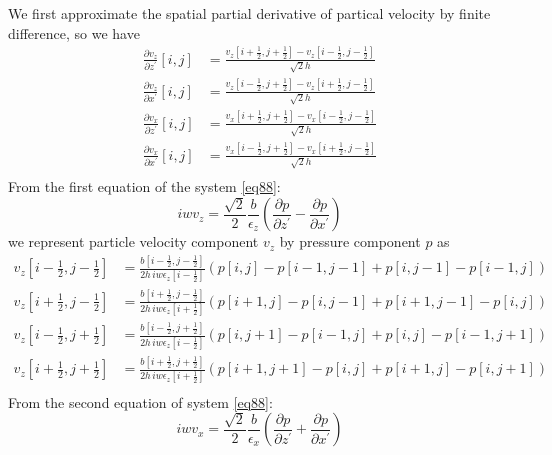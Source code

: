 \documentclass[revised,endfloat]{geophysics}
\begin{document}
We first approximate the spatial partial derivative of partical velocity by finite difference, so we have
\begin{equation}
\begin{split}
\frac{\partial v_z}{\partial z^{\prime}}[i,j] &= \frac{v_z[i+\frac{1}{2},j+\frac{1}{2}] - v_z[i-\frac{1}{2},j-\frac{1}{2}] }{\sqrt{2}h} \\
\frac{\partial v_z}{\partial x^{\prime}}[i,j] &= \frac{v_z[i-\frac{1}{2},j+\frac{1}{2}] - v_z[i+\frac{1}{2},j-\frac{1}{2}] }{\sqrt{2}h} \\
\frac{\partial v_x}{\partial z^{\prime}}[i,j] &= \frac{v_x[i+\frac{1}{2},j+\frac{1}{2}] - v_x[i-\frac{1}{2},j-\frac{1}{2}] }{\sqrt{2}h} \\
\frac{\partial v_x}{\partial x^{\prime}}[i,j] &= \frac{v_x[i-\frac{1}{2},j+\frac{1}{2}] - v_x[i+\frac{1}{2},j-\frac{1}{2}] }{\sqrt{2}h} \\
\end{split} 
\label{eq103}
\end{equation}
From the first equation of the system \ref{eq88}:
\begin{equation}
iw v_z = \frac{\sqrt{2}}{2} \frac{b}{\epsilon_z} \left(\frac{\partial p}{\partial z^{\prime}} -\frac{\partial p}{\partial x^{\prime}} \right)
\label{eq104}
\end{equation}
we represent particle velocity component $v_z$ by pressure component $p$ as
\begin{equation}
\begin{split}
v_z[i-\frac{1}{2}, j-\frac{1}{2}] &= \frac{b[i-\frac{1}{2}, j-\frac{1}{2}]}{2h\, iw \epsilon_z[i-\frac{1}{2}]} \left(p[i,j] - p[i-1,j-1] + p[i,j-1] - p[i-1,j] \right) \\
v_z[i+\frac{1}{2}, j-\frac{1}{2}] &= \frac{b[i+\frac{1}{2}, j-\frac{1}{2}]}{2h\, iw \epsilon_z[i+\frac{1}{2}]} \left(p[i+1,j] - p[i,j-1] + p[i+1,j-1] - p[i,j] \right) \\
v_z[i-\frac{1}{2}, j+\frac{1}{2}] &= \frac{b[i-\frac{1}{2}, j+\frac{1}{2}]}{2h\, iw \epsilon_z[i-\frac{1}{2}]} \left(p[i,j+1] - p[i-1,j] + p[i,j] - p[i-1,j+1] \right) \\
v_z[i+\frac{1}{2}, j+\frac{1}{2}] &= \frac{b[i+\frac{1}{2}, j+\frac{1}{2}]}{2h\, iw \epsilon_z[i+\frac{1}{2}]} \left(p[i+1,j+1] - p[i,j] + p[i+1,j] - p[i,j+1] \right) \\
\end{split} 
\label{eq105}
\end{equation}
From the second equation of system \ref{eq88}:
\begin{equation}
iw v_x = \frac{\sqrt{2}}{2} \frac{b}{\epsilon_x} \left( \frac{\partial p}{\partial z^{\prime}} + \frac{\partial p}{\partial x^{\prime}}  \right)   
\label{eq106}
\end{equation}
\end{document}
